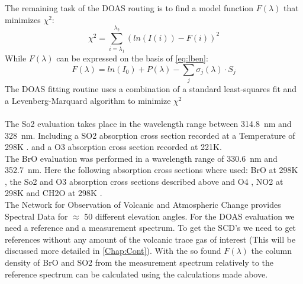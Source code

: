 \documentclass  [
  paper    = a4,
  BCOR     = 10mm,
  twoside,
  fontsize = 12pt,
  fleqn,
  toc      = bibnumbered,
  toc      = listofnumbered,
  numbers  = noendperiod,
  headings = normal,
  listof   = leveldown,
  version  = 3.03
]                                       {scrreprt}
\begin{document}
		The remaining task of the DOAS routing is to find a model function $F \left(\lambda\right)$ that minimizes $\chi^2$:
		\begin{equation}
		\chi^2 = \sum_{i=\lambda_1}^{\lambda_2}\left(ln(I(i))-F(i)\right)^2
		\end{equation}
		While $F\left(\lambda\right)$ can be expressed on the basis of \cref{eq:lben}:
		\begin{equation}
		F\left(\lambda\right) = ln\left(I_0 \right) + P \left(\lambda\right)-
		\sum_{j}\sigma_j \left(\lambda\right) \cdot S_j
		\end{equation}
	The DOAS fitting routine uses a combination of a standard least-squares fit and a Levenberg-Marquard algorithm to minimize $\chi^2$\\
	\\
	The So2 evaluation takes place in the wavelength range between 314.8~nm and 328~nm. Including a SO2 absorption cross section recorded at a Temperature of 298K \cite{vandaele2009fourier}. and a O3 absorption cross section recorded at 221K\cite{burrows1999atmospheric}.\\
	The BrO evaluation was performed in a wavelength range of 330.6~nm and 352.7~nm. Here the following absorption cross sections where used:
	BrO at 298K \cite{fleischmann2004new}, the So2 and O3 absorption cross sections described above and O4 \cite{hermans2003absorption}, NO2 at 298K \cite{vandaele1998measurements} and CH2O at 298K \cite{meller2000temperature}.\\
	The Network for Observation of Volcanic and Atmospheric Change provides Spectral Data for $\approx$ 50 different elevation angles. For the DOAS evaluation we need a reference and a measurement spectrum. To get the SCD's we need to get references without any amount of the volcanic trace gas of interest (This will be discussed more detailed in \cref{Chap:Cont}). With the so found $F\left(\lambda\right)$ the column density of  BrO and SO2 from the measurement spectrum relatively to the reference spectrum can be calculated using the calculations made above. \\
	\\
\end{document}
